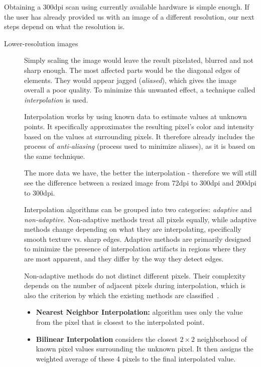 Obtaining a 300dpi scan using currently available hardware is simple enough. If the user has already provided us with an image of a different resolution, our next steps depend on what the resolution is.
\begin{description}
\item[Lower-resolution images] Simply scaling the image would leave the result pixelated, blurred and not sharp enough. The most affected parts would be the diagonal edges of elements. They would appear jagged (\emph{aliased}), which gives the image overall a poor quality. To minimize this unwanted effect, a technique called \emph{interpolation} is used.

Interpolation works by using known data to estimate values at unknown points. It specifically approximates the resulting pixel's color and intensity based on the values at surrounding pixels. It therefore already includes the process of \emph{anti-aliasing} (process used to minimize aliases), as it is based on the same technique.

The more data we have, the better the interpolation - therefore we will still see the difference between a resized image from 72dpi to 300dpi and 200dpi to 300dpi.

Interpolation algorithms can be grouped into two categories: \emph{adaptive} and \emph{non-adaptive}. Non-adaptive methods treat all pixels equally, while adaptive methods change depending on what they are interpolating, specifically smooth texture vs. sharp edges. Adaptive methods are primarily designed to minimize the presence of interpolation artifacts in regions where they are most apparent, and they differ by the way they detect edges.

Non-adaptive methods do not distinct different pixels. Their complexity depends on the number of adjacent pixels during interpolation, which is also the criterion by which the existing methods are classified~\cite{interpolation}.

\begin{itemize}
\item\textbf {Nearest Neighbor Interpolation: } algorithm uses only the value from the pixel that is closest to the interpolated point.

\item\textbf {Bilinear Interpolation } considers the closest $2\times2$ neighborhood of known pixel values surrounding the unknown pixel. It then assigns the weighted average of these 4 pixels to the final interpolated value.


\end{itemize}
\end{description}
